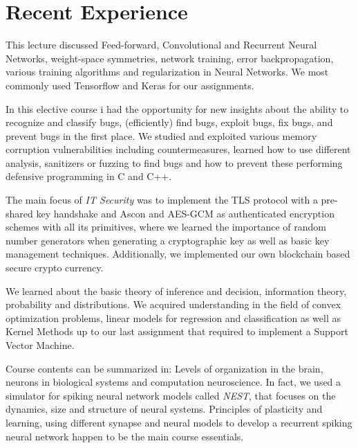 \documentclass[]{resume}
\begin{document}
\begin{minipage}[t]{0.66\textwidth} 
	\section{Recent Experience} 
	
		This lecture discussed Feed-forward, Convolutional and Recurrent Neural Networks, weight-space symmetries, network training, error backpropagation, various training algorithms and regularization in Neural Networks. We most commonly used Tensorflow and Keras for our assignments. \sectionsep

		In this elective course i had the opportunity for new insights about the ability to recognize and classify bugs, (efficiently) find bugs, exploit bugs, fix bugs, and prevent bugs in the first place. We studied and exploited various memory corruption vulnerabilities including countermeasures, learned how to use different analysis, sanitizers or fuzzing to find bugs and how to prevent these performing defensive programming in C and C++. \sectionsep		
	
		The main focus of \textit{IT Security} was to implement the TLS protocol with a pre-shared key handshake and Ascon and AES-GCM as authenticated encryption schemes with all its primitives, where we learned the importance of random number generators when generating a cryptographic key as well as basic key management techniques. Additionally, we implemented our own blockchain based secure crypto currency. \sectionsep
	
		We learned about the basic theory of inference and decision, information theory, probability and distributions. We acquired understanding in the field of convex optimization problems, linear models for regression and classification as well as Kernel Methods up to our last assignment that required to implement a Support Vector Machine. \sectionsep
	
		Course contents can be summarized in: Levels of organization in the brain, neurons in biological systems and computation neuroscience. In fact, we used a simulator for spiking neural network models called \textit{NEST}, that focuses on the dynamics, size and structure of neural systems. Principles of plasticity and learning, using different synapse and neural models to develop a recurrent spiking neural network happen to be the main course essentials. \sectionsep
	

\end{minipage}
\end{document}

